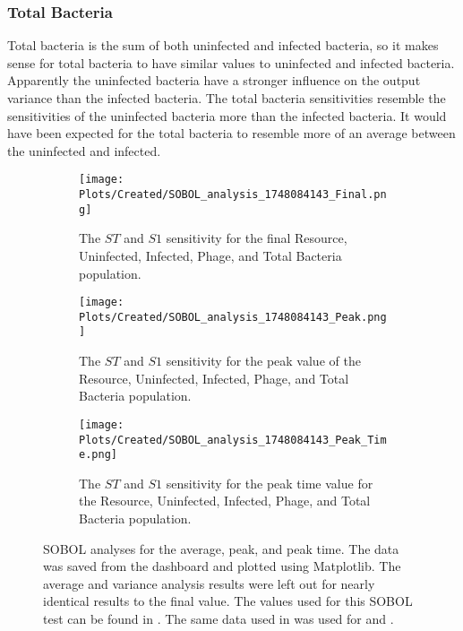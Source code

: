 \subsubsection{Total Bacteria}
Total bacteria is the sum of both uninfected and infected bacteria, so it makes sense for total bacteria to have similar values to uninfected and infected bacteria. 
Apparently the uninfected bacteria have a stronger influence on the output variance than the infected bacteria. 
The total bacteria sensitivities resemble the sensitivities of the uninfected bacteria more than the infected bacteria. 
It would have been expected for the total bacteria to resemble more of an average between the uninfected and infected. 

\begin{figure}
    \centering
    \begin{subfigure}{0.32\linewidth}
        \centering
        \captionsetup{width=1\linewidth}
        \texttt{[image: Plots/Created/SOBOL\_analysis\_1748084143\_Final.png]}
        \caption{
            The $ST$ and $S1$ sensitivity for the final Resource, Uninfected, Infected, Phage, and Total Bacteria population. 
        }
        \label{fig:created:SOBOL_final}
    \end{subfigure}
    \hfill
    \begin{subfigure}{0.32\linewidth}
        \centering
        \captionsetup{width=1\linewidth}
        \texttt{[image: Plots/Created/SOBOL\_analysis\_1748084143\_Peak.png]}
        \caption{
            The $ST$ and $S1$ sensitivity for the peak value of the Resource, Uninfected, Infected, Phage, and Total Bacteria population. 
        }
        \label{fig:created:SOBOL_peak}
    \end{subfigure}
    \hfill
    \begin{subfigure}{0.32\linewidth}
        \centering
        \captionsetup{width=1\linewidth}
        \texttt{[image: Plots/Created/SOBOL\_analysis\_1748084143\_Peak\_Time.png]}
        \caption{
            The $ST$ and $S1$ sensitivity for the peak time value for the Resource, Uninfected, Infected, Phage, and Total Bacteria population. 
        }
        \label{fig:created:SOBOL_peak_time}
    \end{subfigure}
    \caption{
        SOBOL analyses for the average, peak, and peak time. 
        The data was saved from the dashboard and plotted using Matplotlib. 
        The average and variance analysis results were left out for nearly identical results to the final value. 
        The values used for this SOBOL test can be found in . 
        The same data used in  was used for  and . 
    }
    \label{fig:created:SOBOL_analyses}
\end{figure}

